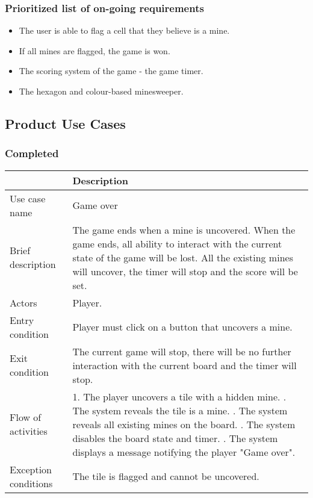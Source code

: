 \documentclass[12pt, a4]{report}
\begin{document}
			\subsubsection{Prioritized list of on-going requirements}
			\begin{itemize}
				\item The user is able to flag a cell that they believe is a mine.
				\item If all mines are flagged, the game is won.
				\item The scoring system of the game - the game timer. 
				\item The hexagon and colour-based minesweeper.
			\end{itemize}	
		
	
	\subsection{Product Use Cases}
	\subsubsection{Completed}
	\begin{table}[ht]
	\begin{tabular}{|p{4cm}|p{12cm}|}
		\hline
		 & Description \\
		\hline
		Use case name & Game over \\
		Brief description & The game ends when a mine is uncovered. When the game ends, all ability to interact with the current state of the game will be lost. All the existing mines will uncover, the timer will stop and the score will be set. \\
		Actors & Player. \\
		Entry condition & Player must click on a button that uncovers a mine. \\
		Exit condition & The current game will stop, there will be no further interaction with the current board and the timer will stop. \\
		Flow of activities & 1. The player uncovers a tile with a hidden mine. \newline 2. The system reveals the tile is a mine. \newline 3. The system reveals all existing mines on the board. \newline 4. The system disables the board state and timer. \newline 5. The system displays a message notifying the player "Game over". \\
		Exception conditions & The tile is flagged and cannot be uncovered.\\
		\hline
	\end{tabular}
	\end{table}
\end{document}
